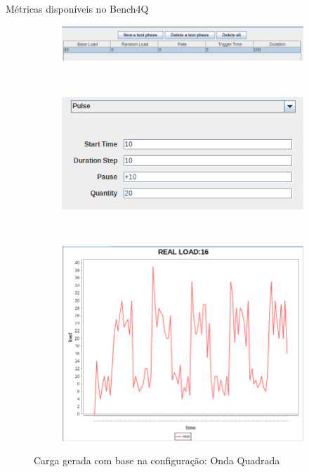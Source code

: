 \begin{frame}{Métricas disponíveis no Bench4Q}
	\begin{figure}[!htb]
		\begin{subfigure}{\linewidth}
			\centering
			\includegraphics[scale=0.7]{../monograph/images/condiguracao-carga-bench4q3.png}
			\label{fig:condiguracao-carga-bench4q3}
		\end{subfigure}\\
		\begin{subfigure}{\linewidth}
			\centering
			\includegraphics[scale=0.7]{../monograph/images/condiguracao-carga-modulada3.png}
			\label{fig:condiguracao-carga-modulada3}
		\end{subfigure}\\[1ex]
		\begin{subfigure}{\linewidth}
			\centering
			\includegraphics[scale=0.6]{../monograph/images/grafico-carga-modulada3.png}
			\label{fig:grafico-carga-modulada3}
		\end{subfigure}
		\caption{Carga gerada com base na configuração: Onda Quadrada}
		\label{fig:carga-modulada3}
	\end{figure}
\end{frame}